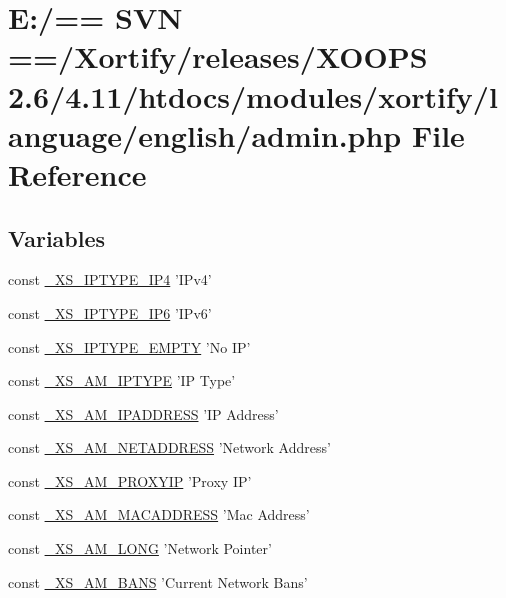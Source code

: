 \hypertarget{admin_8php}{\section{E\-:/== S\-V\-N ==/\-Xortify/releases/\-X\-O\-O\-P\-S 2.6/4.11/htdocs/modules/xortify/language/english/admin.php File Reference}
\label{admin_8php}
}
\subsection*{Variables}
\begin{DoxyCompactItemize}
\item 
const \hyperlink{admin_8php_abc1ff29169a949be307aee2df3aaed2d}{\-\_\-\-X\-S\-\_\-\-I\-P\-T\-Y\-P\-E\-\_\-\-I\-P4} 'I\-Pv4'
\item 
const \hyperlink{admin_8php_a9c7e9d9f83dbd4bc0ff65ca5aed3b89a}{\-\_\-\-X\-S\-\_\-\-I\-P\-T\-Y\-P\-E\-\_\-\-I\-P6} 'I\-Pv6'
\item 
const \hyperlink{admin_8php_a307ce2dd126665a03dadf72004635d2b}{\-\_\-\-X\-S\-\_\-\-I\-P\-T\-Y\-P\-E\-\_\-\-E\-M\-P\-T\-Y} 'No I\-P'
\item 
const \hyperlink{admin_8php_aa1beda4a2cf402e94dd56feb627a3ac9}{\-\_\-\-X\-S\-\_\-\-A\-M\-\_\-\-I\-P\-T\-Y\-P\-E} 'I\-P Type'
\item 
const \hyperlink{admin_8php_a4cbc5b28dd9e2a27eed730b8e78466f9}{\-\_\-\-X\-S\-\_\-\-A\-M\-\_\-\-I\-P\-A\-D\-D\-R\-E\-S\-S} 'I\-P Address'
\item 
const \hyperlink{admin_8php_a38a035a36a30fc40a6be44ac576a030e}{\-\_\-\-X\-S\-\_\-\-A\-M\-\_\-\-N\-E\-T\-A\-D\-D\-R\-E\-S\-S} 'Network Address'
\item 
const \hyperlink{admin_8php_a4a82d909aa5d43e1d73aca4e25c9d1f5}{\-\_\-\-X\-S\-\_\-\-A\-M\-\_\-\-P\-R\-O\-X\-Y\-I\-P} 'Proxy I\-P'
\item 
const \hyperlink{admin_8php_afcbe4d825abea3eb73f739aabe6e3ffe}{\-\_\-\-X\-S\-\_\-\-A\-M\-\_\-\-M\-A\-C\-A\-D\-D\-R\-E\-S\-S} 'Mac Address'
\item 
const \hyperlink{admin_8php_ad7def70ea1a456f44a6cee82016ba442}{\-\_\-\-X\-S\-\_\-\-A\-M\-\_\-\-L\-O\-N\-G} 'Network Pointer'
\item 
const \hyperlink{admin_8php_abed901e3f7de30e94bdd70dee96812e1}{\-\_\-\-X\-S\-\_\-\-A\-M\-\_\-\-B\-A\-N\-S} 'Current Network Bans'

\end{DoxyCompactItemize}
